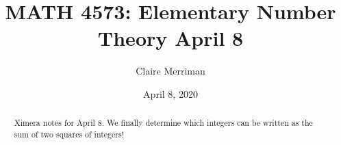 \documentclass{xourse}
\title{MATH 4573: Elementary Number Theory April 8}
\author{Claire Merriman}
\date{April 8, 2020}
\begin{document}
  
\begin{abstract} %
Ximera notes for April 8. We finally determine which integers can be written as the sum of two squares of integers!
\end{abstract}  
\maketitle 
 
 
\end{document}
